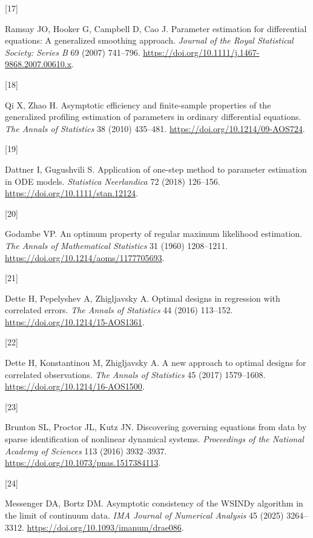 \documentclass[
  american,
  11pt,
]{article}
\newlength{\cslhangindent}
\newlength{\csllabelwidth}
\newenvironment{CSLReferences}[2] %
 {\begin{list}{}{%
  \setlength{\itemindent}{0pt}
  \setlength{\leftmargin}{0pt}
  \setlength{\parsep}{0pt}
  \ifodd #1
   \setlength{\leftmargin}{\cslhangindent}
   \setlength{\itemindent}{-1\cslhangindent}
  \fi
  \setlength{\itemsep}{#2\baselineskip}}}
 {\end{list}}
\newcommand{\CSLLeftMargin}[1]{\parbox[t]{\csllabelwidth}{\strut#1\strut}}
\newcommand{\CSLRightInline}[1]{\parbox[t]{\linewidth - \csllabelwidth}{\strut#1\strut}}
\begin{document}
\begin{CSLReferences}{0}{0}
\CSLLeftMargin{{[}17{]} }%
\CSLRightInline{Ramsay JO, Hooker G, Campbell D, Cao J. Parameter
estimation for differential equations: A generalized smoothing approach.
\emph{Journal of the Royal Statistical Society: Series B} 69 (2007)
741--796. \url{https://doi.org/10.1111/j.1467-9868.2007.00610.x}.}

\CSLLeftMargin{{[}18{]} }%
\CSLRightInline{Qi X, Zhao H. Asymptotic efficiency and finite-sample
properties of the generalized profiling estimation of parameters in
ordinary differential equations. \emph{The Annals of Statistics} 38
(2010) 435--481. \url{https://doi.org/10.1214/09-AOS724}.}

\CSLLeftMargin{{[}19{]} }%
\CSLRightInline{Dattner I, Gugushvili S. Application of one-step method
to parameter estimation in {ODE} models. \emph{Statistica Neerlandica}
72 (2018) 126--156. \url{https://doi.org/10.1111/stan.12124}.}

\CSLLeftMargin{{[}20{]} }%
\CSLRightInline{Godambe VP. An optimum property of regular maximum
likelihood estimation. \emph{The Annals of Mathematical Statistics} 31
(1960) 1208--1211. \url{https://doi.org/10.1214/aoms/1177705693}.}

\CSLLeftMargin{{[}21{]} }%
\CSLRightInline{Dette H, Pepelyshev A, Zhigljavsky A. Optimal designs in
regression with correlated errors. \emph{The Annals of Statistics} 44
(2016) 113--152. \url{https://doi.org/10.1214/15-AOS1361}.}

\CSLLeftMargin{{[}22{]} }%
\CSLRightInline{Dette H, Konstantinou M, Zhigljavsky A. A new approach
to optimal designs for correlated observations. \emph{The Annals of
Statistics} 45 (2017) 1579--1608.
\url{https://doi.org/10.1214/16-AOS1500}.}

\CSLLeftMargin{{[}23{]} }%
\CSLRightInline{Brunton SL, Proctor JL, Kutz JN. Discovering governing
equations from data by sparse identification of nonlinear dynamical
systems. \emph{Proceedings of the National Academy of Sciences} 113
(2016) 3932--3937. \url{https://doi.org/10.1073/pnas.1517384113}.}

\CSLLeftMargin{{[}24{]} }%
\CSLRightInline{Messenger DA, Bortz DM. Asymptotic consistency of the
{WSINDy} algorithm in the limit of continuum data. \emph{IMA Journal of
Numerical Analysis} 45 (2025) 3264--3312.
\url{https://doi.org/10.1093/imanum/drae086}.}


\end{CSLReferences}
\end{document}
